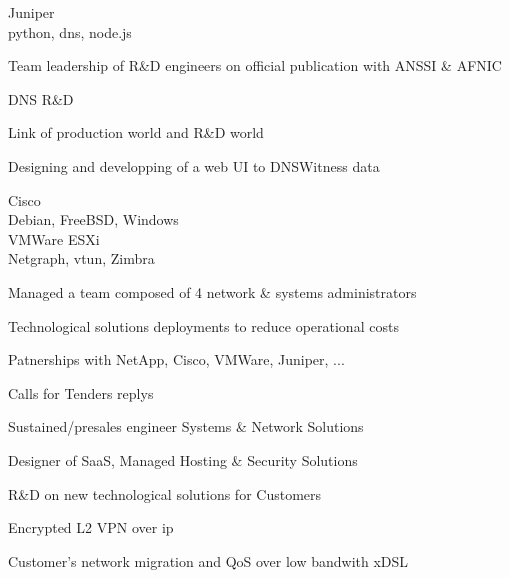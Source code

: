 \documentclass[a4paper,11pt]{cv4tw}%
\begin{document}
	{Juniper\\python, dns, node.js}
		{
		\begin{missions}
			\item Team leadership of R\&D engineers on official publication with ANSSI \& AFNIC
			\item DNS R\&D
			\item Link of production world and R\&D world
			\item Designing and developping of a web UI to DNSWitness data
		\end{missions}
	}


	{Cisco\\Debian, FreeBSD, Windows\\VMWare ESXi\\Netgraph, vtun, Zimbra}
		{
		\begin{missions}
			\item Managed a team composed of 4 network \& systems administrators
			\item Technological solutions deployments to reduce operational costs
			\item Patnerships with NetApp, Cisco, VMWare, Juniper, ...
			\item Calls for Tenders replys
			\item Sustained/presales engineer Systems \& Network Solutions
			\item Designer of SaaS, Managed Hosting \& Security Solutions
			\item R\&D on new technological solutions for Customers
			\item Encrypted L2 VPN over ip
			\item Customer's network migration and QoS over low bandwith xDSL
		\end{missions}
	}
\end{document}
